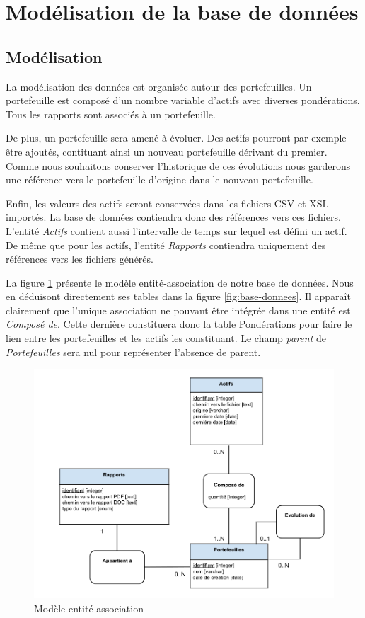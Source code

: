 \documentclass[a4paper,titlepage,french]{report}
\begin{document}
\section{Modélisation de la base de données}

\subsection{Modélisation}

La modélisation des données est organisée autour des portefeuilles.
Un portefeuille est composé d'un nombre variable d'actifs avec diverses pondérations.
Tous les rapports sont associés à un portefeuille.

De plus, un portefeuille sera amené à évoluer.
Des actifs pourront par exemple être ajoutés, contituant ainsi un nouveau portefeuille dérivant du premier.
Comme nous souhaitons conserver l'historique de ces évolutions nous garderons une référence vers le portefeuille d'origine dans le nouveau portefeuille.

Enfin, les valeurs des actifs seront conservées dans les fichiers CSV et XSL importés. 
La base de données contiendra donc des références vers ces fichiers.
L'entité \textit{Actifs} contient aussi l'intervalle de temps sur lequel est défini un actif.
De même que pour les actifs, l'entité \textit{Rapports} contiendra uniquement des références vers les fichiers générés.

La figure \ref{fig:modele-entite-association} présente le modèle entité-association de notre base de données.
Nous en déduisont directement ses tables dans la figure \ref{fig:base-donnees}.
Il apparaît clairement que l'unique association ne pouvant être intégrée dans une entité est \textit{Composé de}.
Cette dernière constituera donc la table Pondérations pour faire le lien entre les portefeuilles et les actifs les constituant.
Le champ \textit{parent} de \textit{Portefeuilles} sera nul pour représenter l'absence de parent.

\begin{figure}
  	\center
  	\includegraphics[width=1\textwidth]{modele-entite-association.png}
  	\caption{Modèle entité-association}
  	\label{fig:modele-entite-association}
\end{figure}
\end{document}
